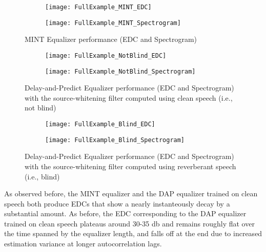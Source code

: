 \begin{figure}[H]
	\centering
	\begin{subfigure}[b]{0.38\textwidth}
		\centering
		\texttt{[image: FullExample\_MINT\_EDC]}
	\end{subfigure}
	\begin{subfigure}[b]{0.49\textwidth}
		\centering
		\texttt{[image: FullExample\_MINT\_Spectrogram]}
	\end{subfigure}
	\caption{MINT Equalizer performance (EDC and Spectrogram)}
	\label{fig:fullExample_MINT}
\end{figure}


\begin{figure}[H]
	\centering
	\begin{subfigure}[b]{0.38\textwidth}
		\centering
		\texttt{[image: FullExample\_NotBlind\_EDC]}
	\end{subfigure}
	\begin{subfigure}[b]{0.49\textwidth}
		\centering
		\texttt{[image: FullExample\_NotBlind\_Spectrogram]}
	\end{subfigure}
	\caption{Delay-and-Predict Equalizer performance (EDC and Spectrogram) with the source-whitening filter computed using clean speech (i.e., not blind)}
	\label{fig:fullExample_NotBlind}
\end{figure}


\begin{figure}[H]
	\centering
	\begin{subfigure}[b]{0.38\textwidth}
		\centering
		\texttt{[image: FullExample\_Blind\_EDC]}
	\end{subfigure}
	\begin{subfigure}[b]{0.49\textwidth}
		\centering
		\texttt{[image: FullExample\_Blind\_Spectrogram]}
	\end{subfigure}
	\caption{Delay-and-Predict Equalizer performance (EDC and Spectrogram) with the source-whitening filter computed using reverberant speech (i.e., blind)}
	\label{fig:fullExample_Blind}
\end{figure}

As observed before, the MINT equalizer and the DAP equalizer trained on clean speech both produce EDCs that show a nearly instanteously decay by a substantial amount. As before, the EDC corresponding to the DAP equalizer trained on clean speech plateaus around 30-35 \unit{\decibel} and remains roughly flat over the time spanned by the equalizer length, and falls off at the end due to increased estimation variance at longer autocorrelation lags.

